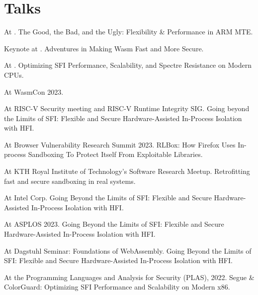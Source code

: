 \section{Talks}

{ At . The Good, the Bad, and the Ugly: Flexibility \& Performance in ARM MTE.}

{ Keynote at . Adventures in Making Wasm Fast and More Secure.}

{ At . Optimizing SFI Performance, Scalability, and Spectre
Resistance on Modern CPUs.}

{ At WasmCon 2023. }

{ At RISC-V Security meeting and RISC-V Runtime Integrity SIG. Going beyond the
Limits of SFI: Flexible and Secure Hardware-Assisted In-Process Isolation with
HFI. }

{ At Browser Vulnerability Research Summit 2023. RLBox: How Firefox Uses
In-process Sandboxing To Protect Itself From Exploitable Libraries. }

{ At KTH Royal Institute of Technology's Software Research Meetup.
Retrofitting fast and secure sandboxing in real systems.
}

{ At Intel Corp. Going Beyond the Limits of SFI: Flexible and Secure
Hardware-Assisted In-Process Isolation with HFI. }

{ At ASPLOS 2023. Going Beyond the Limits of SFI: Flexible and Secure
Hardware-Assisted In-Process Isolation with HFI. }

{ At Dagstuhl Seminar:
{Foundations of WebAssembly}. Going Beyond the Limits of SFI: Flexible and
Secure Hardware-Assisted In-Process Isolation with HFI. }

{ At the Programming Languages and Analysis for Security (PLAS), 2022. Segue \&
ColorGuard: Optimizing SFI Performance and Scalability on Modern x86. }


